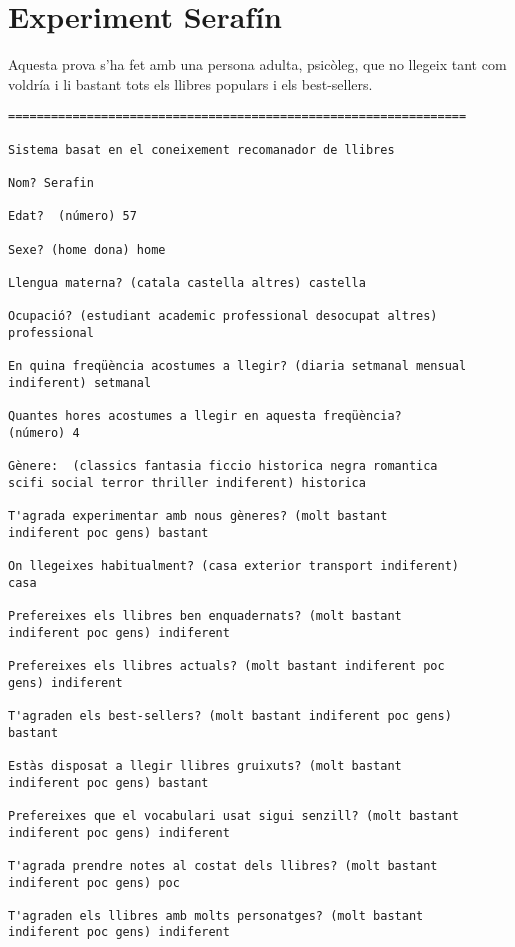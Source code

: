 
\section{Experiment Serafín}

Aquesta prova s'ha fet amb una persona adulta, psicòleg, que no llegeix tant com voldría i li bastant tots els llibres populars i els best-sellers.

\begin{verbatim}
================================================================

Sistema basat en el coneixement recomanador de llibres

Nom? Serafin

Edat?  (número) 57

Sexe? (home dona) home

Llengua materna? (catala castella altres) castella

Ocupació? (estudiant academic professional desocupat altres)
professional

En quina freqüència acostumes a llegir? (diaria setmanal mensual
indiferent) setmanal

Quantes hores acostumes a llegir en aquesta freqüència?
(número) 4

Gènere:  (classics fantasia ficcio historica negra romantica
scifi social terror thriller indiferent) historica

T'agrada experimentar amb nous gèneres? (molt bastant
indiferent poc gens) bastant

On llegeixes habitualment? (casa exterior transport indiferent)
casa

Prefereixes els llibres ben enquadernats? (molt bastant
indiferent poc gens) indiferent

Prefereixes els llibres actuals? (molt bastant indiferent poc
gens) indiferent

T'agraden els best-sellers? (molt bastant indiferent poc gens)
bastant

Estàs disposat a llegir llibres gruixuts? (molt bastant
indiferent poc gens) bastant

Prefereixes que el vocabulari usat sigui senzill? (molt bastant
indiferent poc gens) indiferent

T'agrada prendre notes al costat dels llibres? (molt bastant
indiferent poc gens) poc

T'agraden els llibres amb molts personatges? (molt bastant
indiferent poc gens) indiferent


\end{verbatim}
